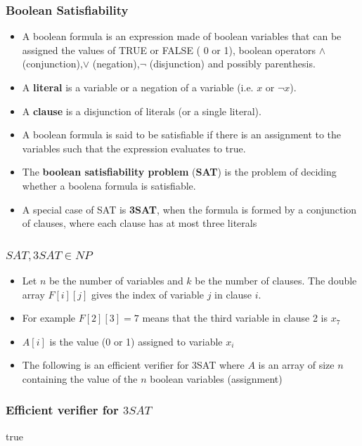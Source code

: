 \documentclass{beamer}
\begin{document}
\begin{frame}
  \frametitle{Boolean Satisfiability}
  \begin{itemize}
  \item A boolean formula is an expression made of boolean variables that can be assigned the values of TRUE or FALSE  ( 0 or 1), boolean operators $\land$ (conjunction),$\lor$ (negation),$\lnot$ (disjunction) and possibly parenthesis.
\item A \textbf{literal} is a variable or a negation of a variable (i.e. $x$ or $\lnot x$).
\item A \textbf{clause} is a disjunction of literals (or a single literal).
  \item A boolean formula is said to be satisfiable if there is an assignment to the variables such that the expression evaluates to true.
\item The \textbf{boolean satisfiability problem} (\textbf{SAT}) is the problem of deciding whether a boolena formula is satisfiable.


\item A special case of SAT is \textbf{ 3SAT}, when the formula is formed by a conjunction of clauses, where each clause has at most three literals 
  \end{itemize}
\end{frame}
\begin{frame}
  \frametitle{$SAT,3SAT\in NP$}
  
  \begin{itemize}
   \item Let $n$ be the number of variables and  $k$ be the number of clauses. The double array $F[i][j]$ gives the index of variable $j$ in clause $i$.
  \item For example $F[2][3]=7$ means that the third variable in clause 2 is $x_7$
  \item $A[i]$ is the value (0 or 1) assigned to variable $x_i$
   \item The following is an efficient verifier for 3SAT where $A$ is an array of size $n$ containing the value of the $n$ boolean variables (assignment)
  \end{itemize}
 \end{frame}

\begin{frame}
\frametitle{Efficient verifier for $3SAT$}
 \begin{function}[H]
 
  \DontPrintSemicolon
  \BlankLine

\Return true\;  

\end{function}
\end{frame}
\end{document}
